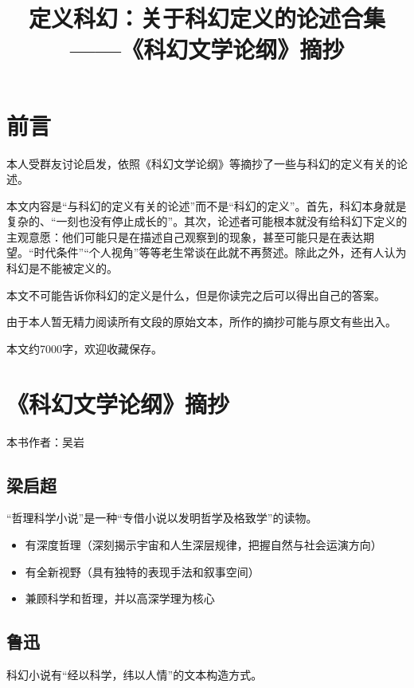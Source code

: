 \documentclass{ctexart}
\begin{document}
\title{定义科幻：关于科幻定义的论述合集——《科幻文学论纲》摘抄}
\maketitle

\section{前言}
本人受群友讨论启发，依照《科幻文学论纲》等摘抄了一些与科幻的定义有关的论述。

本文内容是“与科幻的定义有关的论述”而不是“科幻的定义”。首先，科幻本身就是复杂的、“一刻也没有停止成长的”。其次，论述者可能根本就没有给科幻下定义的主观意愿：他们可能只是在描述自己观察到的现象，甚至可能只是在表达期望。“时代条件”“个人视角”等等老生常谈在此就不再赘述。除此之外，还有人认为科幻是不能被定义的。

本文不可能告诉你科幻的定义是什么，但是你读完之后可以得出自己的答案。

由于本人暂无精力阅读所有文段的原始文本，所作的摘抄可能与原文有些出入。

本文约7000字，欢迎收藏保存。
\tableofcontents
\section{《科幻文学论纲》摘抄}

本书作者：吴岩

\subsection{梁启超}
“哲理科学小说”是一种“专借小说以发明哲学及格致学”的读物。

\begin{itemize}
    \item 有深度哲理（深刻揭示宇宙和人生深层规律，把握自然与社会运演方向） 

    \item 有全新视野（具有独特的表现手法和叙事空间）

    \item 兼顾科学和哲理，并以高深学理为核心
\end{itemize}

\subsection{鲁迅}
科幻小说有“经以科学，纬以人情”的文本构造方式。
\end{document}
